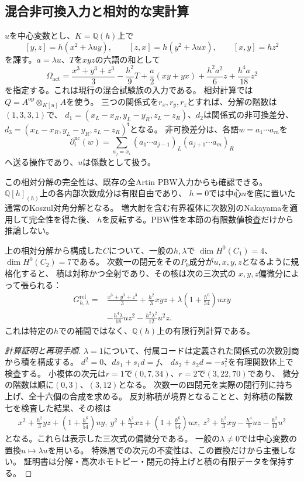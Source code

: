 \subsection{混合非可換入力と相対的な実計算}
$u$を中心変数とし、$K=\mathbb Q(h)$上で
\[
 [y,z]=h(x^2+\lambda uy),\qquad
 [z,x]=h(y^2+\lambda ux),\qquad [x,y]=hz^2
\]
を課す。$a=\lambda u$、$T$を$xyz$の六語の和として
\[
 \Omega_{\mathrm{act}}
 =\frac{x^3+y^3+z^3}{3}-\frac{h^2}{9}T
 +\frac a2(xy+yx)+\frac{h^2a^2}{6}z+\frac{h^4a}{18}z^2
\]
を指定する。これは現行の混合試験族の入力である。
相対計算では$Q=A^{\mathrm{op}}\otimes_{K[u]}A$を使う。
三つの関係式を$r_x,r_y,r_z$とすれば、分解の階数は$(1,3,3,1)$で、
$d_1=(x_L-x_R,y_L-y_R,z_L-z_R)$、$d_2$は関係式の非可換差分、
$d_3=(x_L-x_R,y_L-y_R,z_L-z_R)^{\mathsf t}$となる。
非可換差分は、各語$w=a_1\cdots a_m$を
\[
 \partial^{\mathrm{nc}}_i(w)
 =\sum_{a_j=x_i}(a_1\cdots a_{j-1})_L
                  (a_{j+1}\cdots a_m)_R
\]
へ送る操作であり、$u$は係数として扱う。

この相対分解の完全性は、既存の全Artin PBW入力からも確認できる。
$\mathbb Q[h]_{(h)}$上の各内部次数成分は有限自由であり、
$h=0$では中心$u$を底に置いた通常のKoszul対角分解となる。
増大射を含む有界複体に次数別のNakayamaを適用して完全性を得た後、
$h$を反転する。PBW性を本節の有限数値検査だけから推論しない。

\begin{proposition}[相対対角の低次数積の厳密計算]
\label{cd:prop:relative-formula}
上の相対分解から構成した$C$について、一般の$h,\lambda$で
$\dim H^0(C_1)=4$、$\dim H^0(C_2)=7$である。
次数一の閉元をその$P_0$成分が$u,x,y,z$となるように規格化すると、
積は対称かつ全射であり、その核は次の三次式の
$x,y,z$偏微分によって張られる：
\begin{align*}
 G^{\mathrm{rel}}_{h,\lambda}={}&
 \frac{x^3+y^3+z^3}{3}+\frac{h^2}{3}xyz
 +\lambda\left(1+\frac{h^6}{54}\right)uxy\\
 &-\frac{h^4\lambda}{18}uz^2
 -\frac{h^2\lambda^2}{12}u^2z.
\end{align*}
これは特定の$h$での補間ではなく、$\mathbb Q(h)$上の有限行列計算である。
\end{proposition}
\begin{proof}[計算証明と再現手順]
$\lambda=1$について、付属コードは定義された関係式の次数別商から積を構成する。
$d^2=0$、$ds_1+s_1d=f$、
$ds_2+s_2d=-s_1^2$を有理関数体上で検査する。
小複体の次元は$r=1$で$(0,7,34)$、$r=2$で$(3,22,70)$であり、
微分の階数は順に$(0,3)$、$(3,12)$となる。
次数一の四閉元を実際の閉行列に持ち上げ、全十六個の合成を求める。
反対称積が境界となることと、対称積の階数七を検査した結果、その核は
\[
\begin{split}
 x^2+\frac{h^2}{3}yz+\left(1+\frac{h^6}{54}\right)uy,\
 y^2+\frac{h^2}{3}xz+\left(1+\frac{h^6}{54}\right)ux,\
 z^2+\frac{h^2}{3}xy-\frac{h^4}{9}uz-\frac{h^2}{12}u^2
\end{split}
\]
となる。これらは表示した三次式の偏微分である。
一般の$\lambda\ne0$では中心変数の置換$u\mapsto\lambda u$を用いる。
特殊層での次元の不変性は、この置換だけから主張しない。
証明書は分解・高次ホモトピー・閉元の持上げと積の有限データを保持する。
\end{proof}

